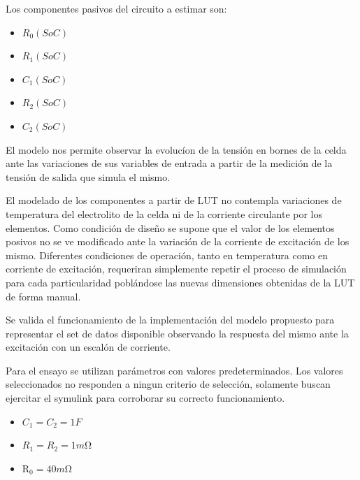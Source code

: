 \documentclass[10pt, a4paper]{report}
\begin{document}
Los componentes pasivos del circuito a estimar son: 

\begin{itemize}
    \item $R_{0}(SoC)$
    \item $R_{1}(SoC)$
    \item $C_{1}(SoC)$
    \item $R_{2}(SoC)$
    \item $C_{2}(SoC)$
\end{itemize}

El modelo nos permite observar la evolucíon de la tensión en bornes de la celda
ante las variaciones de sus variables de entrada a partir de la medición de la
tensi\'on de salida que simula el mismo.

El modelado de los componentes a partir de \acrshort{LUT} no contempla
variaciones de temperatura del electrolito de la celda ni de la corriente
circulante por los elementos. Como condición de diseño se supone que el valor de
los elementos posivos no se ve modificado ante la variación de la corriente de
excitación de los mismo. Diferentes condiciones de operación, tanto en
temperatura como en corriente de excitación, requeriran simplemente repetir el
proceso de simulación para cada particularidad poblándose las nuevas dimensiones
obtenidas de la \acrshort{LUT} de forma manual.

Se valida el funcionamiento de la implementación del modelo propuesto para
representar el set de datos disponible observando la respuesta del mismo ante la
excitaci\'on con un escal\'on de corriente.

Para el ensayo se utilizan par\'ametros con valores predeterminados. Los valores
seleccionados no responden a ningun criterio de selección, solamente buscan
ejercitar el symulink para corroborar su correcto funcionamiento.

\begin{itemize}
    \item $C_{1} = C_{2} = 1F$
    \item $ R_{1} = R_{2} = 1m\mathrm{\Omega}$
    \item $\mathrm{R_0}=40m\mathrm{\Omega}$
\end{itemize}
\end{document}
